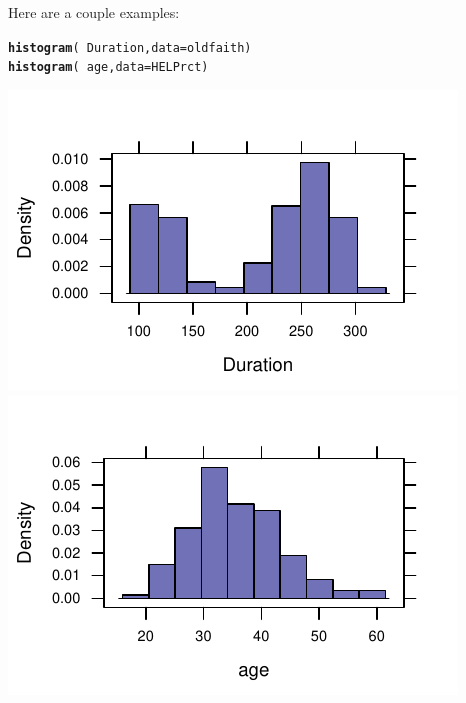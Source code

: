 \documentclass[twoside]{book}\usepackage[]{graphicx}\usepackage[]{xcolor}
\makeatletter
\def\maxwidth{ %
  \ifdim\Gin@nat@width>\linewidth
    \linewidth
  \else
    \Gin@nat@width
  \fi
}
\newcommand{\hlopt}[1]{\textcolor[rgb]{0,0,0}{#1}}%
\newcommand{\hlstd}[1]{\textcolor[rgb]{0.345,0.345,0.345}{#1}}%
\newcommand{\hlkwc}[1]{\textcolor[rgb]{0.333,0.667,0.333}{#1}}%
\newcommand{\hlkwd}[1]{\textcolor[rgb]{0.737,0.353,0.396}{\textbf{#1}}}%
\newenvironment{kframe}{%
 \def\at@end@of@kframe{}%
 \ifinner\ifhmode%
  \def\at@end@of@kframe{\end{minipage}}%
  \begin{minipage}{\columnwidth}%
 \fi\fi%
 \def\FrameCommand##1{\hskip\@totalleftmargin \hskip-\fboxsep
 \colorbox{shadecolor}{##1}\hskip-\fboxsep
     \hskip-\linewidth \hskip-\@totalleftmargin \hskip\columnwidth}%
 \MakeFramed {\advance\hsize-\width
   \@totalleftmargin\z@ \linewidth\hsize
   \@setminipage}}%
 {\par\unskip\endMakeFramed%
 \at@end@of@kframe}
\newenvironment{knitrout}{}{} %
\newcounter{example}[section]
\makeatother
\begin{document}
Here are a couple examples:
\begin{knitrout}
\color{fgcolor}\begin{kframe}
\begin{alltt}
\hlkwd{histogram}\hlstd{(} \hlopt{~} \hlstd{Duration,} \hlkwc{data}\hlstd{=oldfaith )}
\hlkwd{histogram}\hlstd{(} \hlopt{~} \hlstd{age,} \hlkwc{data}\hlstd{=HELPrct )}
\end{alltt}
\end{kframe}

{\centering \includegraphics[width=\maxwidth]{figures/fig-histogram-1} 
\includegraphics[width=\maxwidth]{figures/fig-histogram-2} 

}



\end{knitrout}
\end{document}

